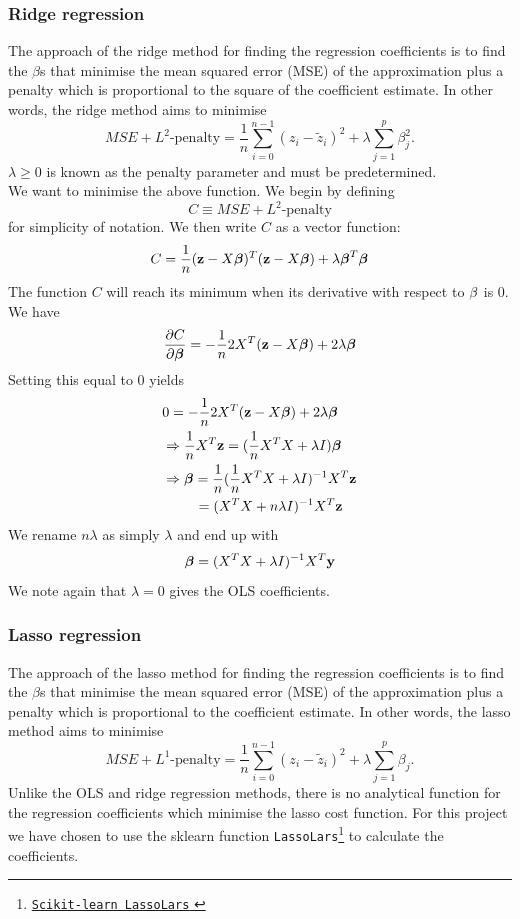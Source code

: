 \documentclass[notitlepage, reprint, nofootinbib]{revtex4-1}
\begin{document}
\subsubsection{Ridge regression}
The approach of the ridge method for finding the regression coefficients is to find the $\beta$s that minimise the mean squared error (MSE) of the approximation plus a penalty which is proportional to the square of the coefficient estimate. In other words, the ridge method aims to minimise
\begin{equation}MSE+L^2\text{-penalty}=\frac{1}{n}\sum_{i=0}^{n-1}(z_i-\tilde{z}_i)^2+\lambda\sum_{j=1}^p \beta_j^2.\end{equation}
$\lambda\geq0$ is known as the penalty parameter and must be predetermined. \\[2mm]
We want to minimise the above function. We begin by defining 
$$C\equiv MSE+L^2\text{-penalty}$$
for simplicity of notation. We then write $C$ as a vector function: 
$$C=\frac{1}{n}(\vb{z}-X\boldsymbol{\beta})^T(\vb{z}-X\boldsymbol{\beta})+\lambda\boldsymbol{\beta}^T\boldsymbol{\beta}$$
The function $C$ will reach its minimum when its derivative with respect to $\vb{\beta}$ is 0. We have
$$\pdv{C}{\boldsymbol{\beta}}=-\frac{1}{n}2X^T(\vb{z}-X\boldsymbol{\beta})+2\lambda\boldsymbol{\beta}$$
Setting this equal to 0 yields
\begin{align*}
	&0=-\frac{1}{n}2X^T(\vb{z}-X\boldsymbol{\beta})+2\lambda\boldsymbol{\beta}\\
	&\Rightarrow \frac{1}{n}X^T\vb{z}=(\frac{1}{n}X^TX+\lambda I)\boldsymbol{\beta}\\
	&\Rightarrow \boldsymbol{\beta}=\frac{1}{n}(\frac{1}{n}X^TX+\lambda I)^{-1}X^T\vb{z}\\
	&\quad\quad\  =(X^TX+n\lambda I)^{-1}X^T\vb{z}
\end{align*}
We rename $n\lambda$ as simply $\lambda$ and end up with 
\begin{equation}\label{ridge}\boldsymbol{\beta}=(X^TX+\lambda I)^{-1}X^T\vb{y}\end{equation}
We note again that $\lambda=0$ gives the OLS coefficients. 

\subsubsection{Lasso regression}
The approach of the lasso method for finding the regression coefficients is to find the $\beta$s that minimise the mean squared error (MSE) of the approximation plus a penalty which is proportional to the coefficient estimate. In other words, the lasso method aims to minimise
\begin{equation}MSE+L^1\text{-penalty}=\frac{1}{n}\sum_{i=0}^{n-1}(z_i-\tilde{z}_i)^2+\lambda\sum_{j=1}^p \beta_j.\end{equation}
Unlike the OLS and ridge regression methods, there is no analytical function for the regression coefficients which minimise the lasso cost function. For this project we have chosen to use the sklearn function \texttt{LassoLars}\footnote{\href{https://scikit-learn.org/stable/modules/generated/sklearn.linear_model.LassoLars.html}{\texttt{Scikit-learn LassoLars} }} \cite{scikit-learn} to calculate the coefficients.
\end{document}
